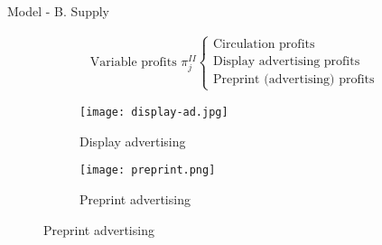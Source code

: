 \documentclass[aspectratio=169]{beamer}
\begin{document}
\begin{frame}{Model - B. Supply}

	\begin{align*}
		\text{Variable profits } \pi_{j}^{II} \begin{cases}
			\text{Circulation profits} \\ 
			\text{Display advertising profits} \\
			\text{Preprint (advertising) profits}
		\end{cases}
	\end{align*}

	\begin{figure}
		\centering
		\begin{subfigure}[b]{5.5cm}
			\centering
			\texttt{[image: display-ad.jpg]}
			\caption{Display advertising}
		\end{subfigure}
		\begin{subfigure}[b]{5.5cm}
			\centering
			\texttt{[image: preprint.png]}
			\caption{Preprint advertising}
		\end{subfigure}
	\end{figure}

\end{frame}
\end{document}
